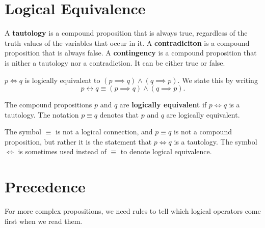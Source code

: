\begin{defn}
\section{Logical Equivalence}
  A \textbf{tautology} is a compound proposition that is always true, regardless of the truth values of the variables that occur in it.
  A \textbf{contradiciton} is a compound proposition that is always false.
  A \textbf{contingency} is a compound proposition that is nither a tautology nor a contradiction.
  It can be either true or false.
\begin{ex}
  \( p \iff q \) is logically equivalent to \( (p \implies q) \wedge (q \implies p)\).
  We state this by writing
  \[ p \leftrightarrow q \equiv (p \implies q) \wedge (q \implies p).\]
\end{ex}
\begin{table}
  \centering
  \caption{The truth table for \((p \lor \neg q) \implies (p \land q)\)}
\end{table}
The compound propositions \(p\) and \(q\) are \textbf{logically equivalent} if \(p \iff q\) is a tautology.
The notation \(p \equiv q\) denotes that \(p\) and \(q\) are logically equivalent.
\begin{remark}
  The symbol \(\equiv\) is not a logical connection, and \(p\equiv q\) is not a compound proposition,
  but rather it is the statement that \(p \iff q\) is a tautology.
  The symbol \(\iff\) is sometimes used instead of \(\equiv\) to denote logical equivalence.
\end{remark}

\section{Precedence}
For more complex propositions, we need rules to tell which logical operators come first when we read them.


\end{defn}
